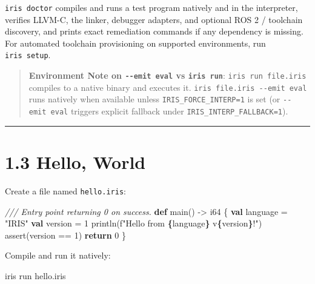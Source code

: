 \documentclass[
  english,
  oneside]{book}
\newenvironment{Shaded}{\begin{snugshade}}{\end{snugshade}}
\newcommand{\CommentTok}[1]{\textcolor[rgb]{0.42,0.60,0.33}{\textit{#1}}}
\newcommand{\ControlFlowTok}[1]{\textcolor[rgb]{0.77,0.53,0.75}{\textbf{#1}}}
\newcommand{\DataTypeTok}[1]{\textcolor[rgb]{0.31,0.79,0.69}{#1}}
\newcommand{\DecValTok}[1]{\textcolor[rgb]{0.71,0.81,0.66}{#1}}
\newcommand{\FunctionTok}[1]{\textcolor[rgb]{0.86,0.86,0.67}{#1}}
\newcommand{\KeywordTok}[1]{\textcolor[rgb]{0.34,0.61,0.84}{\textbf{#1}}}
\newcommand{\NormalTok}[1]{\textcolor[rgb]{0.83,0.83,0.83}{#1}}
\newcommand{\OperatorTok}[1]{\textcolor[rgb]{0.83,0.83,0.83}{#1}}
\newcommand{\StringTok}[1]{\textcolor[rgb]{0.81,0.57,0.47}{#1}}
\begin{document}
\texttt{iris\ doctor} compiles and runs a test program natively and in
the interpreter, verifies LLVM-C, the linker, debugger adapters, and
optional ROS 2 / toolchain discovery, and prints exact remediation
commands if any dependency is missing. For automated toolchain
provisioning on supported environments, run \texttt{iris\ setup}.

\begin{quote}
\textbf{Environment Note on \texttt{-\/-emit\ eval} vs
\texttt{iris\ run}}: \texttt{iris\ run\ file.iris} compiles to a native
binary and executes it. \texttt{iris\ file.iris\ -\/-emit\ eval} runs
natively when available unless \texttt{IRIS\_FORCE\_INTERP=1} is set (or
\texttt{-\/-emit\ eval} triggers explicit fallback under
\texttt{IRIS\_INTERP\_FALLBACK=1}).
\end{quote}

\begin{center}\rule{0.5\linewidth}{0.5pt}\end{center}

\section{1.3 Hello, World}\label{hello-world}

Create a file named \texttt{hello.iris}:

\begin{Shaded}
\begin{Highlighting}[]
\CommentTok{/// Entry point returning 0 on success.}
\KeywordTok{def}\NormalTok{ main() }\OperatorTok{{-}\textgreater{}} \DataTypeTok{i64}\NormalTok{ \{}
    \KeywordTok{val}\NormalTok{ language }\OperatorTok{=} \StringTok{"IRIS"}
    \KeywordTok{val}\NormalTok{ version }\OperatorTok{=} \DecValTok{1}
\NormalTok{    println(}\StringTok{f"Hello from }\ControlFlowTok{\{}\NormalTok{language}\ControlFlowTok{\}}\StringTok{ v}\ControlFlowTok{\{}\NormalTok{version}\ControlFlowTok{\}}\StringTok{!"}\NormalTok{)}
    \FunctionTok{assert}\NormalTok{(version }\OperatorTok{==} \DecValTok{1}\NormalTok{)}
    \ControlFlowTok{return} \DecValTok{0}
\NormalTok{\}}
\end{Highlighting}
\end{Shaded}

Compile and run it natively:

\begin{Shaded}
\begin{Highlighting}[]
\NormalTok{iris run hello.iris}
\end{Highlighting}
\end{Shaded}
\end{document}
